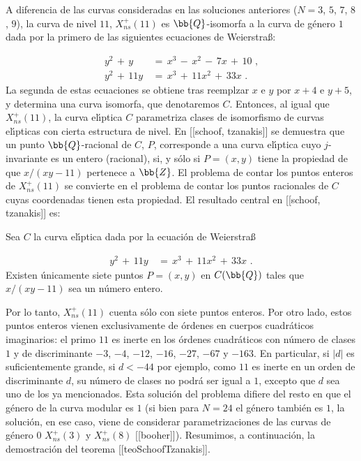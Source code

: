 A diferencia de las curvas consideradas en las soluciones anteriores
($N=3$, $5$, $7$, $8$, $9$), la curva de nivel $11$, $X_{ns}^{+}(11)$
es $\bb{Q}$-isomorfa a la curva de g\'{e}nero $1$ dada por la primero
de las siguientes ecuaciones de Weierstra{\ss}:

\begin{align*}
y^{2}\,+\,y & \,=\,x^{3}\,-\,x^{2}\,-\,7x\,+\,10\text{ ,}\\
y^{2}\,+\,11y & \,=\,x^{3}\,+\,11x^{2}\,+\,33x\text{ .}
\end{align*}
La segunda de estas ecuaciones se obtiene tras reemplzar $x$ e $y$ por
$x+4$ e $y+5$, y determina una curva isomorfa, que denotaremos $C$.
Entonces, al igual que $X_{ns}^{+}(11)$, la curva el\'{\i}ptica $C$
parametriza clases de isomorfismo de curvas el\'{\i}pticas con cierta
estructura de nivel. En [[schoof, tzanakis]] se demuestra que un punto
$\bb{Q}$-racional de $C$, $P$, corresponde a una curva el\'{\i}ptica
cuyo $j$-invariante es un entero (racional), si, y s\'{o}lo si
$P=(x,y)$ tiene la propiedad de que $x/(xy-11)$ pertenece a $\bb{Z}$.
El problema de contar los puntos enteros de $X_{ns}^{+}(11)$ se
convierte en el problema de contar los puntos racionales de $C$ cuyas
coordenadas tienen esta propiedad. El resultado central en
[[schoof, tzanakis]] es:

\begin{teoSchoofTzanakis}
Sea $C$ la curva el\'{\i}ptica dada por la ecuaci\'{o}n de
Weierstra{\ss}

\begin{align*}
y^{2}\,+\,11y & \,=\,x^{3}\,+\,11x^{2}\,+\,33x\text{ .}
\end{align*}
Existen \'{u}nicamente siete puntos $P=(x,y)$ en $C(\bb{Q})$ tales que
$x/(xy-11)$ sea un n\'{u}mero entero.
\end{teoSchoofTzanakis}
Por lo tanto, $X_{ns}^{+}(11)$ cuenta s\'{o}lo con siete puntos
enteros. Por otro lado, estos puntos enteros vienen exclusivamente
de \'{o}rdenes en cuerpos cuadr\'{a}ticos imaginarios: el primo $11$ es
inerte en los \'{o}rdenes cuadr\'{a}ticos con n\'{u}mero de clases
$1$ y de discriminante $-3$, $-4$, $-12$, $-16$, $-27$, $-67$ y $-163$.
En particular, si
$|d|$ es suficientemente grande, si $d<-44$ por ejemplo, como $11$ es
inerte en un orden de discriminante $d$, su n\'{u}mero de clases no
podr\'{a} ser igual a $1$, excepto que $d$ sea uno de los ya
mencionados. Esta soluci\'{o}n del problema difiere del resto en que
el g\'{e}nero de la curva modular es $1$ (si bien para $N=24$ el
g\'{e}nero tambi\'{e}n es $1$, la soluci\'{o}n, en ese caso, viene de
considerar parametrizaciones de las curvas de g\'{e}nero $0$
$X_{ns}^{+}(3)$ y $X_{ns}^{+}(8)$ [[booher]]).
Resumimos, a continuaci\'{o}n, la demostraci\'{o}n del teorema
[[teoSchoofTzanakis]].

